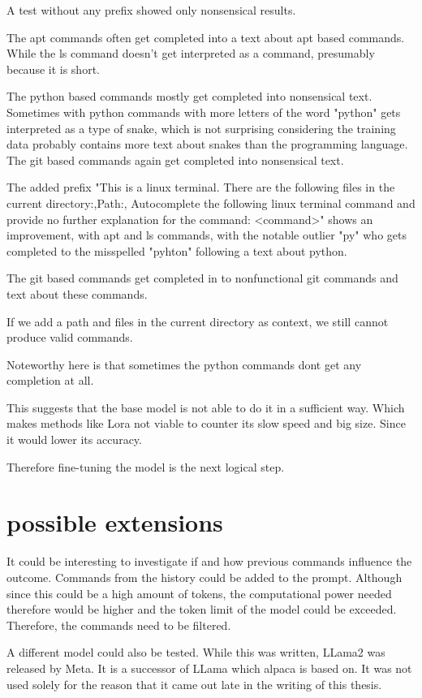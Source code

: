 A test without any prefix showed only nonsensical results.

The apt commands often get completed into a text about apt based commands. While the ls command doesn't get interpreted as a command, presumably because it is short.

The python based commands mostly get completed into nonsensical text. Sometimes with python commands with more letters of the word "python" gets interpreted as a type of snake, which is not surprising considering the training data probably contains more text about snakes than the programming language. The git based commands again get completed into nonsensical text.


The added prefix  "This is a linux terminal. There are the following files in the current  directory:,Path:, Autocomplete the following linux terminal command and provide no further explanation for the command: <command>" shows an improvement, with apt and ls commands, with the notable outlier "py" who gets completed to the misspelled "pyhton" following a text about python.

The git based commands get completed in to nonfunctional git commands and text about these commands.


If we add a path and files in the current directory as context, we still cannot produce valid commands.

Noteworthy here is that sometimes the python commands dont get any completion at all.


This suggests that the base model is not able to do it in a sufficient way. Which makes methods like Lora not viable 
 to counter its slow speed and big size. Since it would lower its accuracy. 

Therefore fine-tuning the model is the next logical step.

\section{possible extensions}




It could be interesting to investigate if and how previous commands influence the outcome. Commands from the history could be added to the prompt. Although since this could be a high amount of tokens, the computational power needed therefore would be higher and the token limit of the model could be exceeded. Therefore, the commands need to be filtered. 


A different model could also be tested. While this was written,  LLama2  was released by Meta. It is a successor of LLama which alpaca is based on. It was not used solely for the reason that it came out late in the writing of this thesis.

